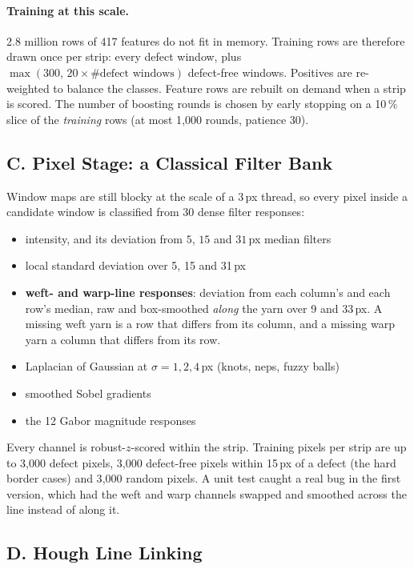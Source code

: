 \documentclass[11pt,a4paper]{article}
\begin{document}
\paragraph{Training at this scale.} 2.8 million rows of 417 features do not fit in memory. Training rows are therefore drawn once per strip: every defect window, plus $\max(300,\,20\times\#\text{defect windows})$ defect-free windows. Positives are re-weighted to balance the classes. Feature rows are rebuilt on demand when a strip is scored. The number of boosting rounds is chosen by early stopping on a 10\,\% slice of the \emph{training} rows (at most 1{,}000 rounds, patience 30).

\subsection*{C. Pixel Stage: a Classical Filter Bank}

Window maps are still blocky at the scale of a 3\,px thread, so every pixel inside a candidate window is classified from 30 dense filter responses:
\begin{itemize}
  \item intensity, and its deviation from $5$, $15$ and $31$\,px median filters
  \item local standard deviation over 5, 15 and 31\,px
  \item \textbf{weft- and warp-line responses}: deviation from each column's and each row's median, raw and box-smoothed \emph{along} the yarn over 9 and 33\,px. A missing weft yarn is a row that differs from its column, and a missing warp yarn a column that differs from its row.
  \item Laplacian of Gaussian at $\sigma=1,2,4$\,px (knots, neps, fuzzy balls)
  \item smoothed Sobel gradients
  \item the 12 Gabor magnitude responses
\end{itemize}
Every channel is robust-$z$-scored within the strip. Training pixels per strip are up to 3{,}000 defect pixels, 3{,}000 defect-free pixels within 15\,px of a defect (the hard border cases) and 3{,}000 random pixels. A unit test caught a real bug in the first version, which had the weft and warp channels swapped and smoothed across the line instead of along it.

\subsection*{D. Hough Line Linking}
\end{document}
